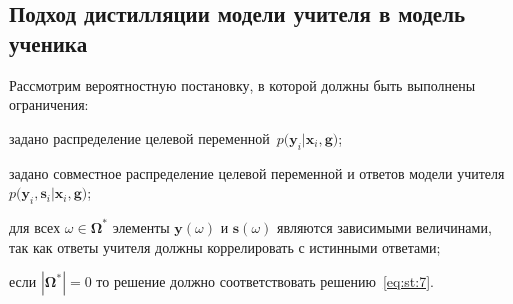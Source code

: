 \documentclass[12pt]{a&t}
\begin{document}
\subsection{Подход дистилляции модели учителя в модель ученика}
Рассмотрим вероятностную постановку, в которой должны быть выполнены ограничения:
\begin{enumlist}
	\item задано распределение целевой переменной~$p\bigr(\mathbf{y}_i|\mathbf{x}_i, \mathbf{g}\bigr)$;
	\item задано совместное распределение целевой переменной и ответов модели учителя~$p\bigr(\mathbf{y}_i, \mathbf{s}_i|\mathbf{x}_i, \mathbf{g}\bigr)$;
	\item для всех $\omega \in \bm{\Omega}^*$ элементы $\mathbf{y}(\omega)$ и $\mathbf{s}(\omega)$ являются зависимыми величинами, так как ответы учителя должны коррелировать с истинными ответами;
	\item если $|\bm{\Omega}^*|=0$ то решение должно соответствовать решению~\eqref{eq:st:7}.
\end{enumlist}
\end{document}
